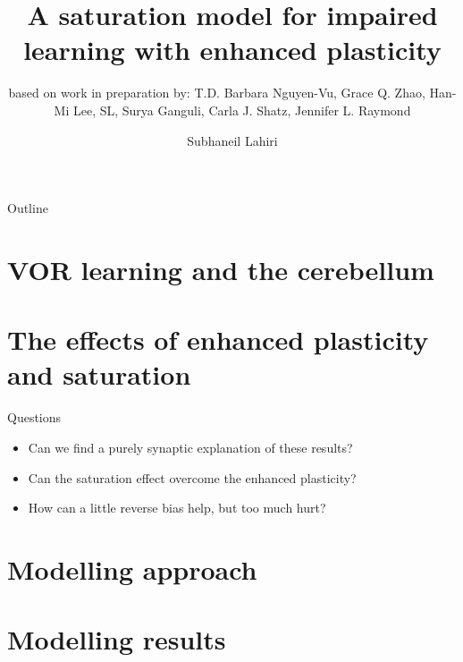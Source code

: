 \documentclass{beamer}%
\title[Impaired learning with enhanced plasticity]{A saturation model for impaired learning with enhanced plasticity}
\subtitle{\small{based on work in preparation by: T.D. Barbara Nguyen-Vu, Grace Q. Zhao, Han-Mi Lee, SL, Surya Ganguli, Carla J. Shatz, Jennifer L. Raymond
}}
\author{Subhaneil Lahiri%
}
\institute[Stanford]{%
Stanford University, Applied Physics
}
\begin{document}

\begin{frame}
%
 \titlepage
%
\end{frame}


\begin{frame}{Outline}
%
 \tableofcontents[hideallsubsections]
%
\end{frame}



\section{VOR learning and the cerebellum}


\section{The effects of enhanced plasticity and saturation}



\begin{frame}{Questions}
%
 \begin{itemize}
   \item Can we find a purely synaptic explanation of these results?
   \item Can the saturation effect overcome the enhanced plasticity?
   \item How can a little reverse bias help, but too much hurt?
 \end{itemize}
%
\end{frame}


\section{Modelling approach}


\section{Modelling results}
\end{document}
